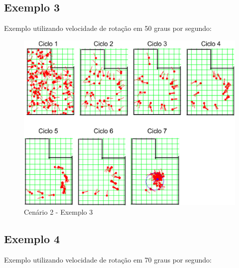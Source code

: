\subsection{Exemplo 3}

Exemplo utilizando velocidade de rotação em 50 graus por segundo:

\begin{figure}[H]
  \centering
  \includegraphics[scale=0.4]{figuras/cen2_ex3.eps}
  \caption[Cenário 2 - Exemplo 3]{Cenário 2 - Exemplo 3}
  \label{img:cen2_ex3}
\end{figure}

\subsection{Exemplo 4}

Exemplo utilizando velocidade de rotação em 70 graus por segundo:

